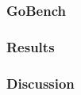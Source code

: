 
\subsubsection{GoBench}
\label{sec:gobench}

\subsubsection{Results}
\label{sec:results}

\subsubsection{Discussion}
\label{discussion}
